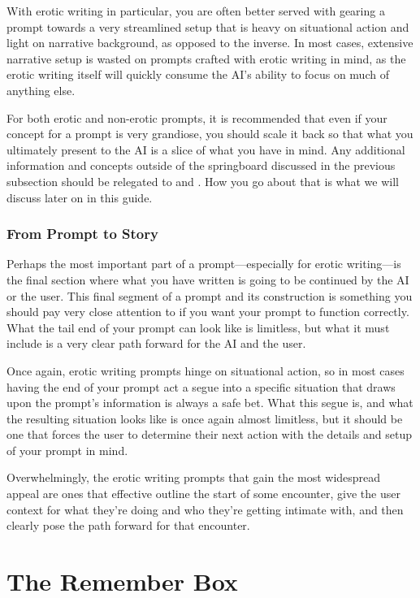﻿\documentclass[Coomer-main.tex]{subfiles}
\begin{document}
With erotic writing in particular, you are often better served with gearing a prompt towards a very streamlined setup that is heavy on situational action and light on narrative background, as opposed to the inverse.
In most cases, extensive narrative setup is wasted on prompts crafted with erotic writing in mind, as the erotic writing itself will quickly consume the AI's ability to focus on much of anything else.

For both erotic and non-erotic prompts, it is recommended that even if your concept for a prompt is very grandiose, you should scale it back so that what you ultimately present to the AI is a slice of what you have in mind.
Any additional information and concepts outside of the springboard discussed in the previous subsection should be relegated to \rem and \wi.
How you go about that is what we will discuss later on in this guide.

\subsection{From Prompt to Story}

Perhaps the most important part of a prompt—especially for erotic writing—is the final section where what you have written is going to be continued by the AI or the user.
This final segment of a prompt and its construction is something you should pay very close attention to if you want your prompt to function correctly.
What the tail end of your prompt can look like is limitless, but what it must include is a very clear path forward for the AI and the user.

Once again, erotic writing prompts hinge on situational action, so in most cases having the end of your prompt act a segue into a specific situation that draws upon the prompt's information is always a safe bet.
What this segue is, and what the resulting situation looks like is once again almost limitless, but it should be one that forces the user to determine their next action with the details and setup of your prompt in mind.

Overwhelmingly, the erotic writing prompts that gain the most widespread appeal are ones that effective outline the start of some encounter, give the user context for what they're doing and who they're getting intimate with, and then clearly pose the path forward for that encounter.

\chapter{The Remember Box}
\label{ch:remember}
\end{document}
